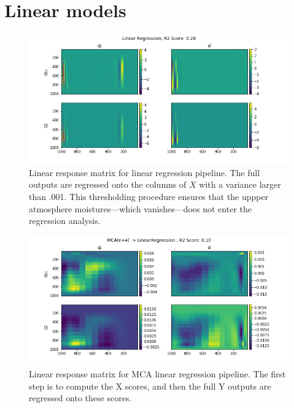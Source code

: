\documentclass{report}
\begin{document}
\section{Linear models}

\begin{figure}[ht]
  \centering
  \includegraphics[width=\textwidth]{images/lrf_lm.png}
  \caption{\label{fig:lrf-lm}Linear response matrix for linear regression
    pipeline. 
    The full outputs are regressed onto the columns of $X$ with a variance
    larger than .001. 
    This thresholding procedure ensures that the uppper atmosphere
    moistures---which vanishes---does not enter the regression analysis.} 
\end{figure}

\begin{figure}[ht]
  \centering
  \includegraphics[width=\textwidth]{images/lrf_mca4.png}
  \caption{\label{fig:lrf-mca}Linear response matrix for MCA linear regression
    pipeline. 
    The first step is to compute the X scores, and then the full Y outputs are
    regressed onto these scores.}
\end{figure}
\end{document}
